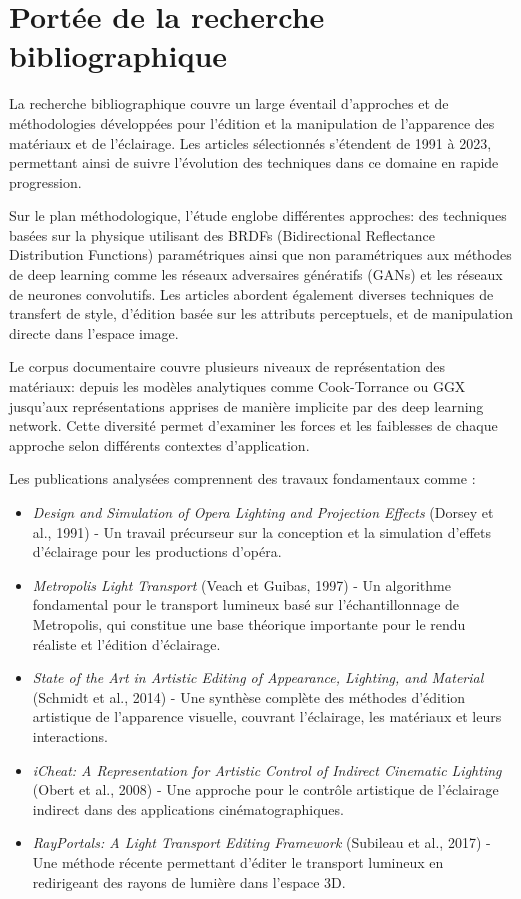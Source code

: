 \documentclass[runningheads]{llncs}
\begin{document}
\section{Portée de la recherche bibliographique}

La recherche bibliographique couvre un large éventail d'approches et de méthodologies développées pour l'édition et la manipulation de l'apparence des matériaux et de l'éclairage. Les articles sélectionnés s'étendent de 1991 à 2023, permettant ainsi de suivre l'évolution des techniques dans ce domaine en rapide progression.

Sur le plan méthodologique, l'étude englobe différentes approches: des techniques basées sur la physique utilisant des BRDFs (Bidirectional Reflectance Distribution Functions) paramétriques ainsi que non paramétriques aux méthodes de deep learning comme les réseaux adversaires génératifs (GANs) et les réseaux de neurones convolutifs. Les articles abordent également diverses techniques de transfert de style, d'édition basée sur les attributs perceptuels, et de manipulation directe dans l'espace image.

Le corpus documentaire couvre plusieurs niveaux de représentation des matériaux: depuis les modèles analytiques comme Cook-Torrance ou GGX jusqu'aux représentations apprises de manière implicite par des deep learning network. Cette diversité permet d'examiner les forces et les faiblesses de chaque approche selon différents contextes d'application.

Les publications analysées comprennent des travaux fondamentaux comme :
\begin{itemize}
\item \textit{Design and Simulation of Opera Lighting and Projection Effects} (Dorsey et al., 1991) - Un travail précurseur sur la conception et la simulation d'effets d'éclairage pour les productions d'opéra.

\item \textit{Metropolis Light Transport} (Veach et Guibas, 1997) - Un algorithme fondamental pour le transport lumineux basé sur l'échantillonnage de Metropolis, qui constitue une base théorique importante pour le rendu réaliste et l'édition d'éclairage.

\item \textit{State of the Art in Artistic Editing of Appearance, Lighting, and Material} (Schmidt et al., 2014) - Une synthèse complète des méthodes d'édition artistique de l'apparence visuelle, couvrant l'éclairage, les matériaux et leurs interactions.

\item \textit{iCheat: A Representation for Artistic Control of Indirect Cinematic Lighting} (Obert et al., 2008) - Une approche pour le contrôle artistique de l'éclairage indirect dans des applications cinématographiques.

\item \textit{RayPortals: A Light Transport Editing Framework} (Subileau et al., 2017) - Une méthode récente permettant d'éditer le transport lumineux en redirigeant des rayons de lumière dans l'espace 3D.
\end{itemize}
\end{document}
